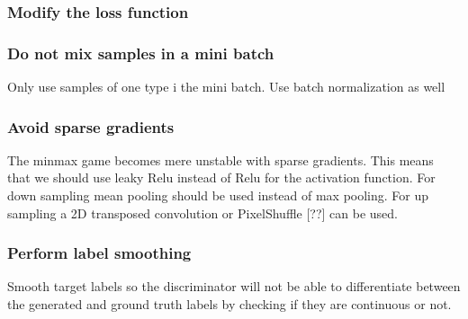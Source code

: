 \documentclass[a4paper,11pt]{article}
\begin{document}
\subsubsection{Modify the loss function}

\subsubsection{Do not mix samples in a mini batch}
Only use samples of one type i the mini batch. Use batch normalization as well
\subsubsection{Avoid sparse gradients}
The minmax game becomes mere unstable with sparse gradients. This means that we should use leaky Relu instead of Relu for the activation function. For down sampling mean pooling should be used instead of max pooling. For up sampling a 2D transposed convolution or PixelShuffle [??] can be used.
\subsubsection{Perform label smoothing}
Smooth target labels so the discriminator will not be able to differentiate between the generated and ground truth labels by checking if they are continuous or not.
\end{document}

